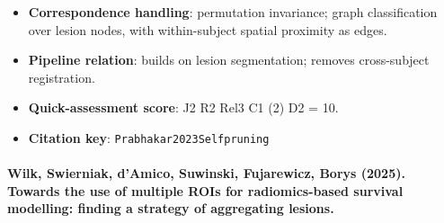 \documentclass[journal,onecolumn]{IEEEtran}
\begin{document}
\begin{itemize}
\item{} \textbf{Correspondence handling}: permutation invariance; graph classification over lesion nodes, with within-subject spatial proximity as edges.

\item{} \textbf{Pipeline relation}: builds on lesion segmentation; removes cross-subject registration.

\item{} \textbf{Quick-assessment score}: J2 R2 Rel3 C1 (2) D2 = 10.

\item{} \textbf{Citation key}: \texttt{Prabhakar2023Selfpruning}

\end{itemize}

\paragraph{Wilk, Swierniak, d'Amico, Suwinski, Fujarewicz, Borys (2025). Towards the use of multiple ROIs for radiomics-based survival modelling: finding a strategy of aggregating lesions.~\cite{Wilk2025Towards}}\mbox{}
\end{document}
